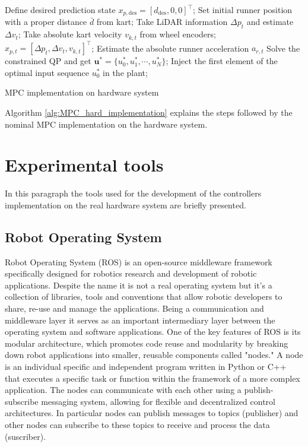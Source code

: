 \documentclass[a4paper,12pt,oneside]{book}
\begin{document}
\begin{algorithm}
\begin{algorithmic}[1]
	\State Define desired prediction state $x_{p,\text{des}} = [d_{\text{des}}, 0, 0]^\top$;
	\State Set initial runner position with a proper distance $\bar{d}$ from kart;
		\State Take LiDAR information $\Delta p_t$ and estimate $\Delta v_t$;
		\State Take absolute kart velocity $v_{k,t}$ from wheel encoders;
		\State $x_{p,t} = [\Delta p_t, \Delta v_t, v_{k,t}]^\top$;
 		\State Estimate the absolute runner acceleration $a_{r,t}$
		\State Solve the constrained QP and get $\boldsymbol{u}^* = \{u_0^*, u_1^*, \cdots, u_N^*\}$; 
		\State Inject the first element of the optimal input sequence $u_0^*$ in the plant;
	\EndFor
\caption{MPC implementation on hardware system}
\label{alg:MPC_hard_implementation}
\end{algorithmic}
\end{algorithm}

Algorithm \ref{alg:MPC_hard_implementation} explains the steps followed by the nominal MPC implementation on the hardware system.

\section{Experimental tools}
In this paragraph the tools used for the development of the controllers implementation on the real hardware system are briefly presented.

\subsection*{Robot Operating System}
Robot Operating System (ROS) is an open-source middleware framework specifically designed for robotics research and development  \cite{ros} of robotic applications. 
Despite the name it is not a real operating system but it's a collection of libraries, tools and conventions that allow robotic developers to share, re-use and manage the applications.
Being a communication and middleware layer it serves as an important intermediary layer between the operating system and software applications.
One of the key features of ROS is its modular architecture, which promotes code reuse and modularity by breaking down robot applications into smaller, reusable components called "nodes." 
A node is an individual specific and independent program written in Python or C++ that executes a specific task or function within the framework of a more complex application.
The nodes can communicate with each other using a publish-subscribe messaging system, allowing for flexible and decentralized control architectures. 
In particular nodes can publish messages to topics (publisher) and other nodes can subscribe to these topics to receive and process the data (suscriber).
\end{document}
